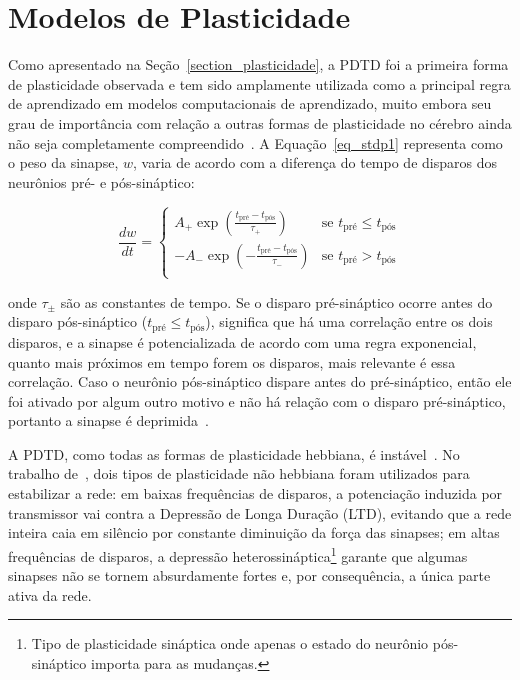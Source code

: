 \section{Modelos de Plasticidade}

Como apresentado na Seção~\ref{section_plasticidade}, a PDTD foi a primeira forma de plasticidade observada e tem sido amplamente
utilizada como a principal regra de aprendizado em modelos computacionais de aprendizado, muito embora seu grau de importância com
relação a outras formas de plasticidade no cérebro ainda não seja completamente compreendido~\cite{feldmanSpike2020}. A
Equação~\ref{eq_stdp1} representa como o peso da sinapse, $w$, varia de acordo com a diferença do tempo de disparos dos neurônios
pré- e pós-sináptico:

\begin{equation}
\label{eq_stdp1}
\frac{dw}{dt} = 
\begin{cases}
      A_{+} \exp(\frac{t_{\text{pré}} - t_{\text{pós}}}{\tau_{+}}) & \text{se $t_{\text{pré}} \le t_{\text{pós}}$}\\
      -A_{-} \exp(-\frac{t_{\text{pré}} - t_{\text{pós}}}{\tau_{-}}) & \text{se $t_{\text{pré}} > t_{\text{pós}}$}\\
\end{cases}
\end{equation}

\noindent{}onde $\tau_{\pm}$ são as constantes de tempo. Se o disparo pré-sináptico ocorre antes do disparo pós-sináptico ($t_{\text{pré}}
\le t_{\text{pós}}$), significa que há uma correlação entre os dois disparos, e a sinapse é potencializada de acordo com uma regra
exponencial, quanto mais próximos em tempo forem os disparos, mais relevante é essa correlação. Caso o neurônio pós-sináptico
dispare antes do pré-sináptico, então ele foi ativado por algum outro motivo e não há relação com o disparo pré-sináptico,
portanto a sinapse é deprimida~\cite{yamazakiSpiking2022}.

A PDTD, como todas as formas de plasticidade hebbiana, é instável~\cite{gerstnerSpiking2002}. No trabalho
de~\cite{zenkeDiverse2015}, dois tipos de plasticidade não hebbiana foram utilizados para estabilizar a rede: em baixas
frequências de disparos, a potenciação induzida por transmissor vai contra a Depressão de Longa Duração (LTD), evitando que a rede
inteira caia em silêncio por constante diminuição da força das sinapses; em altas frequências de disparos, a depressão
heterossináptica\footnote{Tipo de plasticidade sináptica onde apenas o estado do neurônio pós-sináptico importa para as mudanças.}
garante que algumas sinapses não se tornem absurdamente fortes e, por consequência, a única parte ativa da rede.

